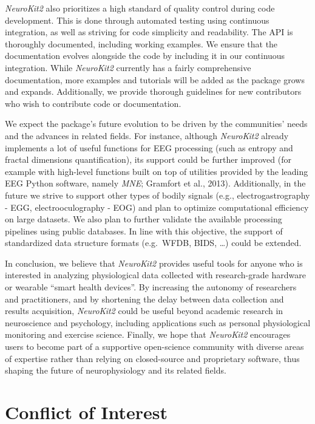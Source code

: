 \documentclass[
  english,
  man,floatsintext]{apa6}
\begin{document}
\emph{NeuroKit2} also prioritizes a high standard of quality control during code development. This is done through automated testing using continuous integration, as well as striving for code simplicity and readability. The API is thoroughly documented, including working examples. We ensure that the documentation evolves alongside the code by including it in our continuous integration. While \emph{NeuroKit2} currently has a fairly comprehensive documentation, more examples and tutorials will be added as the package grows and expands. Additionally, we provide thorough guidelines for new contributors who wish to contribute code or documentation.

We expect the package's future evolution to be driven by the communities' needs and the advances in related fields. For instance, although \emph{NeuroKit2} already implements a lot of useful functions for EEG processing (such as entropy and fractal dimensions quantification), its support could be further improved (for example with high-level functions built on top of utilities provided by the leading EEG Python software, namely \emph{MNE}; Gramfort et al., 2013). Additionally, in the future we strive to support other types of bodily signals (e.g., electrogastrography - EGG, electrooculography - EOG) and plan to optimize computational efficiency on large datasets. We also plan to further validate the available processing pipelines using public databases. In line with this objective, the support of standardized data structure formats (e.g.~WFDB, BIDS, \ldots) could be extended.

In conclusion, we believe that \emph{NeuroKit2} provides useful tools for anyone who is interested in analyzing physiological data collected with research-grade hardware or wearable \enquote{smart health devices}. By increasing the autonomy of researchers and practitioners, and by shortening the delay between data collection and results acquisition, \emph{NeuroKit2} could be useful beyond academic research in neuroscience and psychology, including applications such as personal physiological monitoring and exercise science. Finally, we hope that \emph{NeuroKit2} encourages users to become part of a supportive open-science community with diverse areas of expertise rather than relying on closed-source and proprietary software, thus shaping the future of neurophysiology and its related fields.

\hypertarget{conflict-of-interest}{%
\section{Conflict of Interest}\label{conflict-of-interest}}
\end{document}
